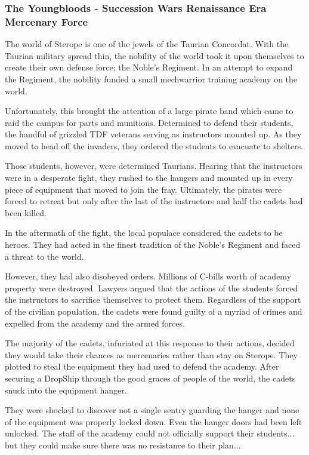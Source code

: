 \subsubsection{The Youngbloods - Succession Wars Renaissance Era Mercenary Force}

The world of Sterope is one of the jewels of the Taurian Concordat.
With the Taurian military spread thin, the nobility of the world took it upon themselves to create their own defense force; the Noble’s Regiment.
In an attempt to expand the Regiment, the nobility funded a small mechwarrior training academy on the world.

Unfortunately, this brought the attention of a large pirate band which came to raid the campus for parts and munitions.
Determined to defend their students, the handful of grizzled TDF veterans serving as instructors mounted up.
As they moved to head off the invaders, they ordered the students to evacuate to shelters.

Those students, however, were determined Taurians.
Hearing that the instructors were in a desperate fight, they rushed to the hangers and mounted up in every piece of equipment that moved to join the fray.
Ultimately, the pirates were forced to retreat but only after the last of the instructors and half the cadets had been killed.

In the aftermath of the fight, the local populace considered the cadets to be heroes.
They had acted in the finest tradition of the Noble’s Regiment and faced a threat to the world.

However, they had also disobeyed orders.
Millions of C-bills worth of academy property were destroyed.
Lawyers argued that the actions of the students forced the instructors to sacrifice themselves to protect them.
Regardless of the support of the civilian population, the cadets were found guilty of a myriad of crimes and expelled from the academy and the armed forces.

The majority of the cadets, infuriated at this response to their actions, decided they would take their chances as mercenaries rather than stay on Sterope.
They plotted to steal the equipment they had used to defend the academy.
After securing a DropShip through the good graces of people of the world, the cadets snuck into the equipment hanger.

They were shocked to discover not a single sentry guarding the hanger and none of the equipment was properly locked down. Even the hanger doors had been left unlocked.
The staff of the academy could not officially support their students... but they could make sure there was no resistance to their plan...
          	
